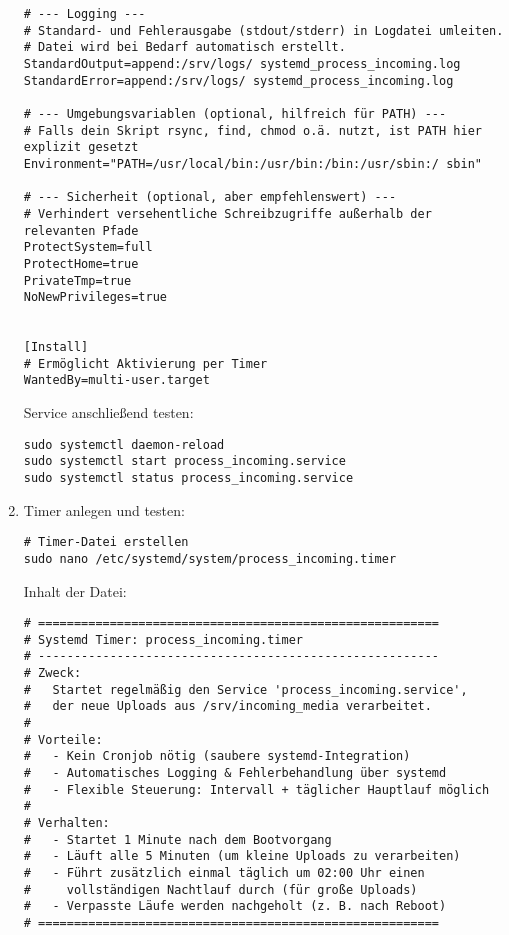 \documentclass[12pt,a4paper]{report}
\begin{document}
\begin{enumerate}
\begin{verbatim}
# --- Logging ---
# Standard- und Fehlerausgabe (stdout/stderr) in Logdatei umleiten.
# Datei wird bei Bedarf automatisch erstellt.
StandardOutput=append:/srv/logs/ systemd_process_incoming.log
StandardError=append:/srv/logs/ systemd_process_incoming.log

# --- Umgebungsvariablen (optional, hilfreich für PATH) ---
# Falls dein Skript rsync, find, chmod o.ä. nutzt, ist PATH hier explizit gesetzt
Environment="PATH=/usr/local/bin:/usr/bin:/bin:/usr/sbin:/ sbin"

# --- Sicherheit (optional, aber empfehlenswert) ---
# Verhindert versehentliche Schreibzugriffe außerhalb der relevanten Pfade
ProtectSystem=full
ProtectHome=true
PrivateTmp=true
NoNewPrivileges=true


[Install]
# Ermöglicht Aktivierung per Timer
WantedBy=multi-user.target
    \end{verbatim}

    \noindent Service anschließend testen:
    \begin{verbatim}
sudo systemctl daemon-reload
sudo systemctl start process_incoming.service
sudo systemctl status process_incoming.service
    \end{verbatim}

    \item Timer anlegen und testen:
    \begin{verbatim}
# Timer-Datei erstellen
sudo nano /etc/systemd/system/process_incoming.timer
    \end{verbatim}

    \noindent Inhalt der Datei:
    \begin{verbatim}
# ========================================================
# Systemd Timer: process_incoming.timer
# --------------------------------------------------------
# Zweck:
#   Startet regelmäßig den Service 'process_incoming.service',
#   der neue Uploads aus /srv/incoming_media verarbeitet.
#
# Vorteile:
#   - Kein Cronjob nötig (saubere systemd-Integration)
#   - Automatisches Logging & Fehlerbehandlung über systemd
#   - Flexible Steuerung: Intervall + täglicher Hauptlauf möglich
#
# Verhalten:
#   - Startet 1 Minute nach dem Bootvorgang
#   - Läuft alle 5 Minuten (um kleine Uploads zu verarbeiten)
#   - Führt zusätzlich einmal täglich um 02:00 Uhr einen
#     vollständigen Nachtlauf durch (für große Uploads)
#   - Verpasste Läufe werden nachgeholt (z. B. nach Reboot)
# ========================================================


\end{verbatim}
\end{enumerate}
\end{document}
